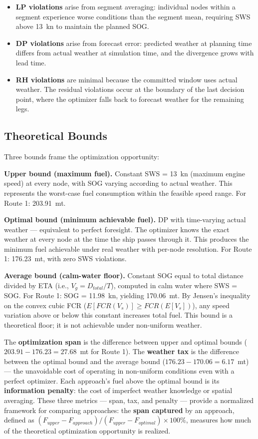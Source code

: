 \documentclass[review,authoryear]{elsarticle}  %
\begin{document}
\begin{itemize}
    \item \textbf{LP violations} arise from segment averaging: individual nodes within a segment experience worse conditions than the segment mean, requiring SWS above 13~kn to maintain the planned SOG.
    \item \textbf{DP violations} arise from forecast error: predicted weather at planning time differs from actual weather at simulation time, and the divergence grows with lead time.
    \item \textbf{RH violations} are minimal because the committed window uses actual weather. The residual violations occur at the boundary of the last decision point, where the optimizer falls back to forecast weather for the remaining legs.
\end{itemize}

\subsection{Theoretical Bounds}
\label{sec:bounds}

Three bounds frame the optimization opportunity:

\textbf{Upper bound (maximum fuel).} Constant SWS = 13~kn (maximum engine speed) at every node, with SOG varying according to actual weather. This represents the worst-case fuel consumption within the feasible speed range. For Route 1: 203.91~mt.

\textbf{Optimal bound (minimum achievable fuel).} DP with time-varying actual weather --- equivalent to perfect foresight. The optimizer knows the exact weather at every node at the time the ship passes through it. This produces the minimum fuel achievable under real weather with per-node resolution. For Route 1: 176.23~mt, with zero SWS violations.

\textbf{Average bound (calm-water floor).} Constant SOG equal to total distance divided by ETA (i.e., $V_g = D_{total} / T$), computed in calm water where SWS = SOG. For Route 1: SOG = 11.98~kn, yielding 170.06~mt. By Jensen's inequality on the convex cubic FCR ($E[FCR(V_s)] \geq FCR(E[V_s])$), any speed variation above or below this constant increases total fuel. This bound is a theoretical floor; it is not achievable under non-uniform weather.

The \textbf{optimization span} is the difference between upper and optimal bounds ($203.91 - 176.23 = 27.68$~mt for Route 1). The \textbf{weather tax} is the difference between the optimal bound and the average bound ($176.23 - 170.06 = 6.17$~mt) --- the unavoidable cost of operating in non-uniform conditions even with a perfect optimizer. Each approach's fuel above the optimal bound is its \textbf{information penalty}: the cost of imperfect weather knowledge or spatial averaging. These three metrics --- span, tax, and penalty --- provide a normalized framework for comparing approaches: the \textbf{span captured} by an approach, defined as $(F_{upper} - F_{approach}) / (F_{upper} - F_{optimal}) \times 100\%$, measures how much of the theoretical optimization opportunity is realized.
\end{document}
